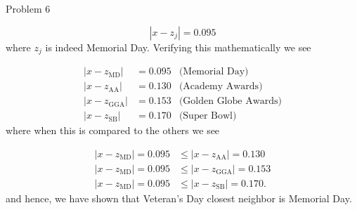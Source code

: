 \begin{problem}{Problem 6}
\begin{Highlight}[Solution]
        \begin{equation}
            |x - z_{j}| = 0.095
        \end{equation}
        where $z_{j}$ is indeed Memorial Day. Verifying this mathematically we see

        \begin{align}
            |x - z_{\text{MD}}| & = 0.095 & \text{(Memorial Day)} \\
            |x - z_{\text{AA}}| & = 0.130 & \text{(Academy Awards)} \\
            |x - z_{\text{GGA}}| & = 0.153 & \text{(Golden Globe Awards)} \\
            |x - z_{\text{SB}}| & = 0.170 & \text{(Super Bowl)}
        \end{align}
        where when this is compared to the others we see

        \begin{align}
            |x - z_{\text{MD}}| = 0.095 & \leq |x - z_{\text{AA}}| = 0.130 \\
            |x - z_{\text{MD}}| = 0.095 & \leq |x - z_{\text{GGA}}| = 0.153 \\
            |x - z_{\text{MD}}| = 0.095 & \leq |x - z_{\text{SB}}| = 0.170.
        \end{align}
        and hence, we have shown that Veteran's Day closest neighbor is Memorial Day.
    \end{Highlight}
\end{problem}

